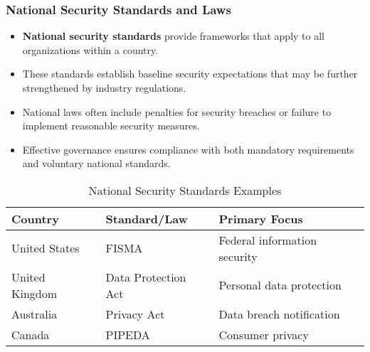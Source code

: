 \documentclass{beamer}
\begin{document}
\begin{frame}
\frametitle{National Security Standards and Laws}
\begin{itemize}
\item \textbf{National security standards} provide frameworks that apply to all organizations within a country.
\item These standards establish baseline security expectations that may be further strengthened by industry regulations.
\item National laws often include penalties for security breaches or failure to implement reasonable security measures.
\item Effective governance ensures compliance with both mandatory requirements and voluntary national standards.
\end{itemize}

\begin{table}
    \scriptsize
\begin{tabular}{|p{3cm}|p{3cm}|p{3cm}|}
\hline
\textbf{Country} & \textbf{Standard/Law} & \textbf{Primary Focus} \\
\hline
United States & FISMA & Federal information security \\
\hline
United Kingdom & Data Protection Act & Personal data protection \\
\hline
Australia & Privacy Act & Data breach notification \\
\hline
Canada & PIPEDA & Consumer privacy \\
\hline
\end{tabular}
\caption{National Security Standards Examples}
\end{table}
\end{frame}
\end{document}
